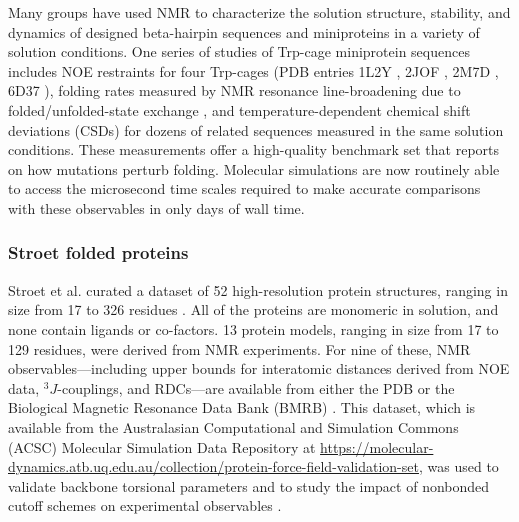 \documentclass[9pt,review,pubversion]{livecoms}
\begin{document}
Many groups have used NMR to characterize the solution structure, stability, and dynamics of designed beta-hairpin sequences \cite{blanco_short_1994,ramirez-alvarado_novo_1996,de_alba_turn_1997,maynard_origin_1998,stanger_rules_1998,cochran_tryptophan_2001,ramirez-alvarado_elongation_2001,pastor_combinatorial_2002,russell_stability_2003,skelton_hairpin_2003,fesinmeyer_enhanced_2004,espinosa_autonomously_2005,andersen_minimization_2006,honda_crystal_2008,kier_stabilizing_2010,scian_mutational_2013,jimenez_design_2014,anderson_nascent_2016,morales_design_2019,richaud_folding_2021,peintner_pushing_2022} and miniproteins \cite{struthers_design_1996,mcknight_nmr_1997,struthers_design_1998,imperiali_uniquely_1999,vermeulen_solution_2004,cornilescu_solution_2007,gronwald_evolutionary_2008} in a variety of solution conditions.
One series of studies of Trp-cage miniprotein sequences \cite{neidigh_designing_2002,lin_helical_2004,barua_trp-cage_2008,scian_crystal_2012,byrne_circular_2013,graham_reversing_2019} includes NOE restraints for four Trp-cages (PDB entries 1L2Y \cite{neidigh_designing_2002}, 2JOF \cite{barua_trp-cage_2008}, 2M7D \cite{byrne_circular_2013}, 6D37 \cite{graham_reversing_2019}), folding rates measured by NMR resonance line-broadening due to folded/unfolded-state exchange \cite{scian_mutational_2013,byrne_folding_2014}, and temperature-dependent chemical shift deviations (CSDs) for dozens of related sequences measured in the same solution conditions.
These measurements offer a high-quality benchmark set that reports on how mutations perturb folding.
Molecular simulations are now routinely able to access the microsecond time scales required to make accurate comparisons with these observables in only days of wall time.

\subsubsection{Stroet folded proteins}
\label{sub2:stroet}

Stroet et al. curated a dataset of 52 high-resolution protein structures, ranging in size from 17 to 326 residues \cite{stroet_validation_2024}.
All of the proteins are monomeric in solution, and none contain ligands or co-factors.
13 protein models, ranging in size from 17 to 129 residues, were derived from NMR experiments.
For nine of these, NMR observables---including upper bounds for interatomic distances derived from NOE data, $^3J$-couplings, and RDCs---are available from either the PDB or the Biological Magnetic Resonance Data Bank (BMRB) \cite{ulrich_biomagresbank_2008,romero_biomagresbank_2020,hoch_biological_2023}. This dataset, which is available from the Australasian Computational and Simulation Commons (ACSC) Molecular Simulation Data Repository \cite{mark_australasian_2022} at \url{https://molecular-dynamics.atb.uq.edu.au/collection/protein-force-field-validation-set}, was used to validate backbone torsional parameters \cite{diem_hamiltonian_2020} and to study the impact of nonbonded cutoff schemes on experimental observables \cite{diem_effect_2020}.
\end{document}
